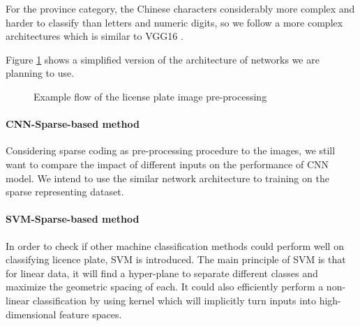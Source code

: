 For the province category, the Chinese characters considerably more complex
and harder to classify than letters and numeric digits, 
so we follow a more complex architectures which is similar to 
VGG16 \cite{simonyan2014very}. 

Figure \ref{fig:CNN_architecture} shows a simplified version of the
architecture of networks we are planning to use.

\begin{figure}[t]
\centering
{}
\qquad
{}
\qquad
\caption{Example flow of the license plate image pre-processing}
\label{fig:CNN_architecture}
\end{figure}

\paragraph{CNN-Sparse-based method}
Considering sparse coding as pre-processing procedure to the images, 
we still want to compare the impact of different inputs on the performance of CNN model.
We intend to use the similar network architecture to training on the sparse representing dataset.

\paragraph{SVM-Sparse-based method}
In order to check if other machine classification methods could perform well 
on classifying licence plate, SVM is introduced. The main principle of SVM is that 
for linear data, it will find a hyper-plane to separate different classes and 
maximize the geometric spacing of each. 
It could also efficiently perform a non-linear classification by using kernel which 
will implicitly turn inputs into high-dimensional feature spaces.